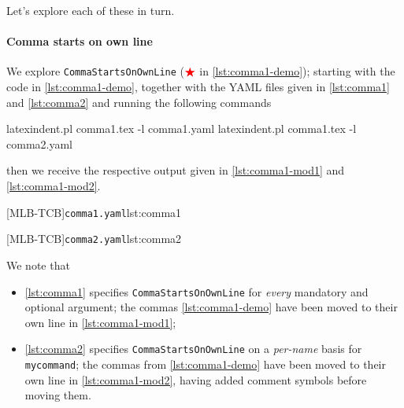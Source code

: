  Let's explore each of these in turn.

 \paragraph{Comma starts on own line}
  \begin{example}
  We explore \texttt{CommaStartsOnOwnLine} ($\color{red}\bigstar$ in
  \cref{lst:comma1-demo}); starting with the code in \cref{lst:comma1-demo}, together
  with the YAML files given in \cref{lst:comma1} and \cref{lst:comma2} and running the
  following commands  

  \begin{commandshell}
latexindent.pl comma1.tex -l comma1.yaml
latexindent.pl comma1.tex -l comma2.yaml
\end{commandshell}

  then we receive the respective output given in \cref{lst:comma1-mod1} and
  \cref{lst:comma1-mod2}.

  \begin{cmhtcbraster}
   [MLB-TCB]{\texttt{comma1.yaml}}{lst:comma1}
  \end{cmhtcbraster}

  \begin{cmhtcbraster}
   [MLB-TCB]{\texttt{comma2.yaml}}{lst:comma2}
  \end{cmhtcbraster}

  We note that
  \begin{itemize}
   \item \cref{lst:comma1} specifies \texttt{CommaStartsOnOwnLine} for
         \emph{every} mandatory and optional argument;
         the commas \cref{lst:comma1-demo} have been moved to their own line in
         \cref{lst:comma1-mod1};
   \item \cref{lst:comma2} specifies \texttt{CommaStartsOnOwnLine} on a
         \emph{per-name} basis for \texttt{mycommand};
         the commas from \cref{lst:comma1-demo} have been moved to their own line in
         \cref{lst:comma1-mod2}, having added comment symbols before moving them.
  \end{itemize}
  \end{example}

